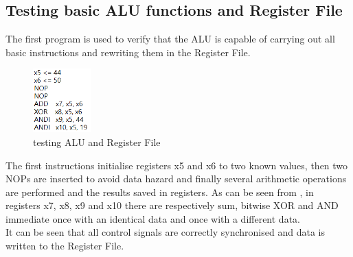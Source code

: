 \subsection{Testing basic ALU functions and Register File}
The first program is used to verify that the ALU is capable of carrying out all basic instructions and rewriting them in the Register File.
\begin{figure}[H]
	\centering
	\includegraphics[width=0.2\textwidth]{sec3/images/test1.png}
	\caption{testing ALU and Register File}
	\label{fig:test1}
\end{figure}
The first instructions initialise registers x5 and x6 to two known values, then two NOPs are inserted to avoid data hazard and finally several arithmetic operations are performed and the results saved in registers. As can be seen from , in registers x7, x8, x9 and x10 there are respectively sum, bitwise XOR and AND immediate once with an identical data and once with a different data.\\
It can be seen that all control signals are correctly synchronised and data is written to the Register File.